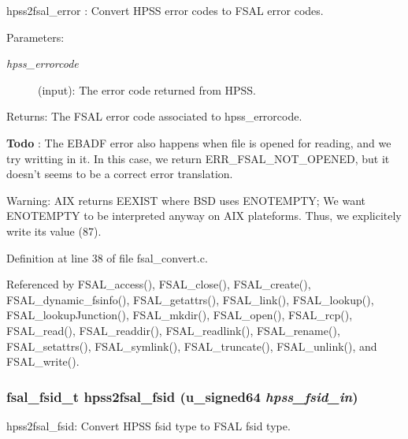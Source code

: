 hpss2fsal\_\-error : Convert HPSS error codes to FSAL error codes.

\begin{Desc}
\item[Parameters:]
\begin{description}
\item[{\em hpss\_\-errorcode}](input): The error code returned from HPSS.\end{description}
\end{Desc}
\begin{Desc}
\item[Returns:]The FSAL error code associated to hpss\_\-errorcode. \end{Desc}


\begin{Desc}
\item[{\bf Todo}]: The EBADF error also happens when file is opened for reading, and we try writting in it. In this case, we return ERR\_\-FSAL\_\-NOT\_\-OPENED, but it doesn't seems to be a correct error translation. \end{Desc}


\begin{Desc}
\item[Warning:]AIX returns EEXIST where BSD uses ENOTEMPTY; We want ENOTEMPTY to be interpreted anyway on AIX plateforms. Thus, we explicitely write its value (87). \end{Desc}


Definition at line 38 of file fsal\_\-convert.c.

Referenced by FSAL\_\-access(), FSAL\_\-close(), FSAL\_\-create(), FSAL\_\-dynamic\_\-fsinfo(), FSAL\_\-getattrs(), FSAL\_\-link(), FSAL\_\-lookup(), FSAL\_\-lookupJunction(), FSAL\_\-mkdir(), FSAL\_\-open(), FSAL\_\-rcp(), FSAL\_\-read(), FSAL\_\-readdir(), FSAL\_\-readlink(), FSAL\_\-rename(), FSAL\_\-setattrs(), FSAL\_\-symlink(), FSAL\_\-truncate(), FSAL\_\-unlink(), and FSAL\_\-write().
\subsubsection[{hpss2fsal\_\-fsid}]{\setlength{\rightskip}{0pt plus 5cm}fsal\_\-fsid\_\-t hpss2fsal\_\-fsid (u\_\-signed64 {\em hpss\_\-fsid\_\-in})}\label{fsal__convert_8c_c54c0723f79f51a9516feb8d7ccfc0d8}


hpss2fsal\_\-fsid: Convert HPSS fsid type to FSAL fsid type.

